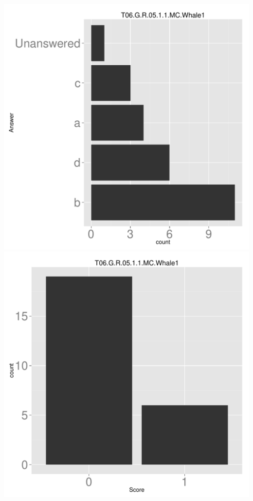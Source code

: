 \documentclass[12pt,nohyper]{tufte-handout}\usepackage[]{graphicx}\usepackage[]{color}
\begin{document}
\begin{center} \includegraphics[width=.45\linewidth]{Topic06_73_answer} \includegraphics[width=.45\linewidth]{Topic06_73_score} \end{center} 
\end{document}
